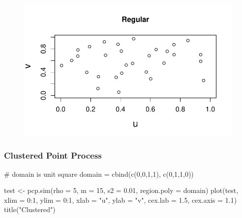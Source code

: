 \documentclass[
  letterpaper,
  DIV=11,
  numbers=noendperiod]{scrartcl}
\newenvironment{Shaded}{\begin{snugshade}}{\end{snugshade}}
\newcommand{\AttributeTok}[1]{\textcolor[rgb]{0.40,0.45,0.13}{#1}}
\newcommand{\CommentTok}[1]{\textcolor[rgb]{0.37,0.37,0.37}{#1}}
\newcommand{\DecValTok}[1]{\textcolor[rgb]{0.68,0.00,0.00}{#1}}
\newcommand{\FloatTok}[1]{\textcolor[rgb]{0.68,0.00,0.00}{#1}}
\newcommand{\FunctionTok}[1]{\textcolor[rgb]{0.28,0.35,0.67}{#1}}
\newcommand{\NormalTok}[1]{\textcolor[rgb]{0.00,0.23,0.31}{#1}}
\newcommand{\OtherTok}[1]{\textcolor[rgb]{0.00,0.23,0.31}{#1}}
\newcommand{\SpecialCharTok}[1]{\textcolor[rgb]{0.37,0.37,0.37}{#1}}
\newcommand{\StringTok}[1]{\textcolor[rgb]{0.13,0.47,0.30}{#1}}
\begin{document}
\begin{figure}[H]

{\centering \includegraphics{robby_homework_1_files/figure-pdf/unnamed-chunk-3-1.pdf}

}

\end{figure}

\hypertarget{clustered-point-process}{%
\subsubsection{Clustered Point Process}\label{clustered-point-process}}

\begin{Shaded}
\begin{Highlighting}[]
\CommentTok{\# domain is unit square}
\NormalTok{domain }\OtherTok{=} \FunctionTok{cbind}\NormalTok{(}\FunctionTok{c}\NormalTok{(}\DecValTok{0}\NormalTok{,}\DecValTok{0}\NormalTok{,}\DecValTok{1}\NormalTok{,}\DecValTok{1}\NormalTok{), }\FunctionTok{c}\NormalTok{(}\DecValTok{0}\NormalTok{,}\DecValTok{1}\NormalTok{,}\DecValTok{1}\NormalTok{,}\DecValTok{0}\NormalTok{))}


\NormalTok{test }\OtherTok{\textless{}{-}} \FunctionTok{pcp.sim}\NormalTok{(}\AttributeTok{rho =} \DecValTok{5}\NormalTok{, }\AttributeTok{m =} \DecValTok{15}\NormalTok{, }\AttributeTok{s2 =} \FloatTok{0.01}\NormalTok{, }\AttributeTok{region.poly =}\NormalTok{ domain)}
\FunctionTok{plot}\NormalTok{(test, }\AttributeTok{xlim =} \DecValTok{0}\SpecialCharTok{:}\DecValTok{1}\NormalTok{, }\AttributeTok{ylim =} \DecValTok{0}\SpecialCharTok{:}\DecValTok{1}\NormalTok{, }\AttributeTok{xlab =} \StringTok{"u"}\NormalTok{, }\AttributeTok{ylab =} \StringTok{"v"}\NormalTok{, }
     \AttributeTok{cex.lab =} \FloatTok{1.5}\NormalTok{, }\AttributeTok{cex.axis =} \FloatTok{1.1}\NormalTok{)}
\FunctionTok{title}\NormalTok{(}\StringTok{"Clustered"}\NormalTok{)}
\end{Highlighting}
\end{Shaded}
\end{document}
